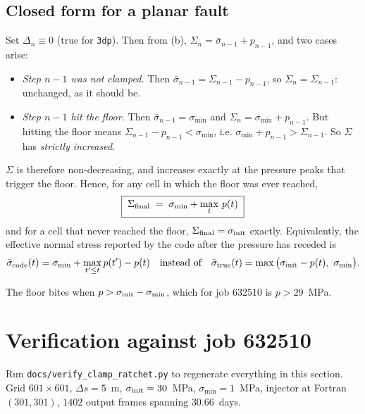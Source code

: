 \documentclass[11pt]{article}
\newcommand{\code}[1]{\texttt{#1}}
\newcommand{\sigeff}{\bar{\sigma}}
\newcommand{\sigtot}{\Sigma}
\begin{document}
\subsection{Closed form for a planar fault}

Set $\Delta_n\equiv0$ (true for \code{3dp}). Then from (b),
$\sigtot_n = \sigeff_{n-1} + p_{n-1}$, and two cases arise:

\begin{itemize}
\item \emph{Step $n-1$ was not clamped.} Then
      $\sigeff_{n-1} = \sigtot_{n-1} - p_{n-1}$, so
      $\sigtot_n = \sigtot_{n-1}$: unchanged, as it should be.
\item \emph{Step $n-1$ hit the floor.} Then $\sigeff_{n-1}=\sigma_{\min}$ and
      $\sigtot_n = \sigma_{\min} + p_{n-1}$. But hitting the floor means
      $\sigtot_{n-1} - p_{n-1} < \sigma_{\min}$, i.e.
      $\sigma_{\min} + p_{n-1} > \sigtot_{n-1}$. So $\sigtot$ has
      \emph{strictly increased}.
\end{itemize}

$\sigtot$ is therefore non-decreasing, and increases exactly at the pressure
peaks that trigger the floor. Hence, for any cell in which the floor was ever
reached,
\begin{equation}
  \boxed{\;\sigtot_{\rm final} \;=\; \sigma_{\min} + \max_{t}\,p(t)\;}
  \label{eq:ratchet}
\end{equation}
and for a cell that never reached the floor, $\sigtot_{\rm final} =
\sigma_{\rm init}$ exactly. Equivalently, the effective normal stress reported
by the code after the pressure has receded is
\begin{equation}
  \sigeff_{\rm code}(t) = \sigma_{\min} + \max_{t'\le t} p(t') - p(t)
  \quad\text{instead of}\quad
  \sigeff_{\rm true}(t) = \max\big(\sigma_{\rm init}-p(t),\ \sigma_{\min}\big).
  \label{eq:err}
\end{equation}

The floor bites when $p > \sigma_{\rm init} - \sigma_{\min}$, which for
job 632510 is $p > 29$~MPa.

\section{Verification against job 632510}

Run \code{docs/verify\_clamp\_ratchet.py} to regenerate everything in this
section. Grid $601\times601$, $\Delta s = 5$~m, $\sigma_{\rm init}=30$~MPa,
$\sigma_{\min}=1$~MPa, injector at Fortran $(301,301)$, $1402$ output frames
spanning $30.66$~days.
\end{document}
